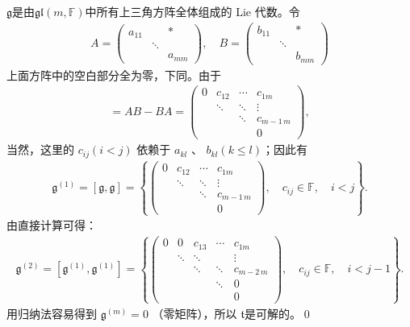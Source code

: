 $\mathfrak{g}$是由$\mathfrak{gl}(m,\mathbb{F})$中所有上三角方阵全体组成的 Lie 代数。令
\begin{align*}
A=\left(\begin{array}{lll}
    a_{11} & & * \\
    & \ddots & \\
    & & a_{m m}
\end{array}\right), \quad
B=\left(\begin{array}{lll}
    b_{11} & & * \\
    & \ddots & \\
    & & b_{mm}
\end{array}\right)
\end{align*}
上面方阵中的空白部分全为零，下同。由于
\begin{align*}
[A, B]=A B-B A=\left(\begin{array}{cccc}
    0 & c_{12} & \cdots & c_{1 m} \\
    & \ddots & \ddots & \vdots \\
    & & \ddots & c_{m-1\, m} \\
    & & & 0
\end{array}\right),
\end{align*}
当然，这里的 $c_{i j}(i<j)$ 依赖于 $a_{kl}$ 、 $b_{kl}(k \leqslant l)$；因此有
\begin{align*}
\mathfrak{g}^{(1)}=[\mathfrak{g}, \mathfrak{g}]
=\left\{\left(\begin{array}{cccc}
    0 & c_{12} & \cdots & c_{1 m} \\
    & \ddots & \ddots & \vdots \\
    & & \ddots & c_{m-1\, m} \\
    & & & 0
\end{array}\right),
\quad c_{i j} \in \mathbb{F}, \quad i<j\right\} .
\end{align*}
由直接计算可得：
\begin{align*}
\mathfrak{g}^{(2)}=\left[\mathfrak{g}^{(1)}, \mathfrak{g}^{(1)}\right]
=\left\{\left(\begin{array}{ccccc}
    0 & 0 & c_{13} & \cdots & c_{1 m} \\
    & \ddots & \ddots & & \vdots \\
    & & \ddots & \ddots & c_{m-2\, m} \\
    & & & \ddots & 0 \\
    & & & & 0
\end{array}\right),
\quad c_{ij} \in \mathbb{F},\quad i<j-1\right\} .
\end{align*}
用归纳法容易得到 $\mathfrak{g}^{(m)}=0$ （零矩阵），所以 $\mathfrak{t}$是可解的。\qed

